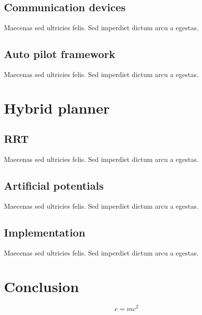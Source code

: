 \documentclass[twoside,twocolumn]{article}
\begin{document}
\subsection{Communication devices}
Maecenas sed ultricies felis. Sed imperdiet dictum arcu a egestas. 
\subsection{Auto pilot framework}
Maecenas sed ultricies felis. Sed imperdiet dictum arcu a egestas. 
\section{Hybrid planner}

\subsection{RRT}
Maecenas sed ultricies felis. Sed imperdiet dictum arcu a egestas. 
\subsection{Artificial potentials}
Maecenas sed ultricies felis. Sed imperdiet dictum arcu a egestas. 
\subsection{Implementation}
Maecenas sed ultricies felis. Sed imperdiet dictum arcu a egestas. 



\section{Conclusion}



\begin{equation}
\label{eq:emc}
e = mc^2
\end{equation}
\end{document}
